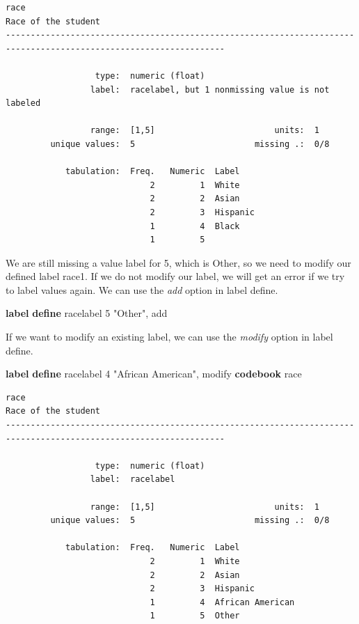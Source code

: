\documentclass[
]{book}
\newenvironment{Shaded}{\begin{snugshade}}{\end{snugshade}}
\newcommand{\KeywordTok}[1]{\textcolor[rgb]{0.13,0.29,0.53}{\textbf{#1}}}
\newcommand{\NormalTok}[1]{#1}
\newcommand{\StringTok}[1]{\textcolor[rgb]{0.31,0.60,0.02}{#1}}
\begin{document}
\begin{verbatim}
race                                                                                           Race of the student
------------------------------------------------------------------------------------------------------------------

                  type:  numeric (float)
                 label:  racelabel, but 1 nonmissing value is not labeled

                 range:  [1,5]                        units:  1
         unique values:  5                        missing .:  0/8

            tabulation:  Freq.   Numeric  Label
                             2         1  White
                             2         2  Asian
                             2         3  Hispanic
                             1         4  Black
                             1         5  
\end{verbatim}

We are still missing a value label for 5, which is Other, so we need to modify our defined label race1. If we do not modify our label, we will get an error if we try to label values again. We can use the \emph{add} option in label define.

\begin{Shaded}
\begin{Highlighting}[]
\KeywordTok{label} \KeywordTok{define}\NormalTok{ racelabel 5 }\StringTok{"Other"}\NormalTok{, add}
\end{Highlighting}
\end{Shaded}

If we want to modify an existing label, we can use the \emph{modify} option in label define.

\begin{Shaded}
\begin{Highlighting}[]
\KeywordTok{label} \KeywordTok{define}\NormalTok{ racelabel 4 }\StringTok{"African American"}\NormalTok{, modify}
\KeywordTok{codebook}\NormalTok{ race}
\end{Highlighting}
\end{Shaded}

\begin{verbatim}
race                                                                                           Race of the student
------------------------------------------------------------------------------------------------------------------

                  type:  numeric (float)
                 label:  racelabel

                 range:  [1,5]                        units:  1
         unique values:  5                        missing .:  0/8

            tabulation:  Freq.   Numeric  Label
                             2         1  White
                             2         2  Asian
                             2         3  Hispanic
                             1         4  African American
                             1         5  Other
\end{verbatim}
\end{document}
